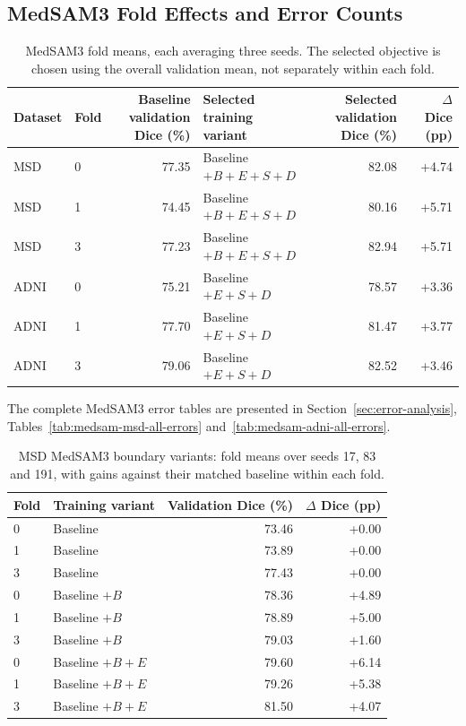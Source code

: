 \clearpage

\subsection{MedSAM3 Fold Effects and Error Counts}
\begin{table}[htbp]
\centering\small{}
\setlength{\tabcolsep}{5pt}
\renewcommand{\arraystretch}{1.15}
\begin{tabular}{@{}llrlrr@{}}
\hline
Dataset & Fold & \shortstack{Baseline validation\\Dice (\%)} & \shortstack{Selected training\\variant} & \shortstack{Selected validation\\Dice (\%)} & \shortstack{$\Delta$ Dice\\(pp)} \\
\hline
MSD & 0 & 77.35 & Baseline $+B+E+S+D$ & 82.08 & +4.74 \\
MSD & 1 & 74.45 & Baseline $+B+E+S+D$ & 80.16 & +5.71 \\
MSD & 3 & 77.23 & Baseline $+B+E+S+D$ & 82.94 & +5.71 \\
ADNI & 0 & 75.21 & Baseline $+E+S+D$ & 78.57 & +3.36 \\
ADNI & 1 & 77.70 & Baseline $+E+S+D$ & 81.47 & +3.77 \\
ADNI & 3 & 79.06 & Baseline $+E+S+D$ & 82.52 & +3.46 \\
\hline
\end{tabular}
\caption{MedSAM3 fold means, each averaging three seeds. The selected objective is chosen using the overall validation mean, not separately within each fold.}
\label{tab:medsam-noaug-folds}
\end{table}
The complete MedSAM3 error tables are presented in
Section~\ref{sec:error-analysis}, Tables~\ref{tab:medsam-msd-all-errors}
and~\ref{tab:medsam-adni-all-errors}.

\begin{table}[htbp]
\centering\small{}
\setlength{\tabcolsep}{5pt}
\renewcommand{\arraystretch}{1.15}
\begin{tabular}{@{}llrr@{}}
\hline
Fold & Training variant & Validation Dice (\%) & $\Delta$ Dice (pp) \\
\hline
0 & Baseline & 73.46 & +0.00 \\
1 & Baseline & 73.89 & +0.00 \\
3 & Baseline & 77.43 & +0.00 \\
0 & Baseline $+B$ & 78.36 & +4.89 \\
1 & Baseline $+B$ & 78.89 & +5.00 \\
3 & Baseline $+B$ & 79.03 & +1.60 \\
0 & Baseline $+B+E$ & 79.60 & +6.14 \\
1 & Baseline $+B+E$ & 79.26 & +5.38 \\
3 & Baseline $+B+E$ & 81.50 & +4.07 \\
\hline
\end{tabular}
\caption{MSD MedSAM3 boundary variants: fold means over seeds 17, 83 and 191, with gains against their matched baseline within each fold.}
\label{tab:medsam-msd-original-folds}
\end{table}
\clearpage

